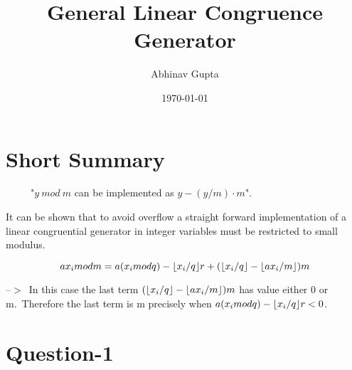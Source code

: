 \documentclass{article}
\title{\textbf{General Linear Congruence Generator}}
\author{Abhinav Gupta}
\date{\today}
\DeclarePairedDelimiter{\floor}{\lfloor}{\rfloor}
\begin{document}
 \tableofcontents
\maketitle

\section{Short Summary}
\ \ \ \ \ "\(y\ mod\ m\) can be implemented as \(y-(y/m) · m\)".

It can be shown that to avoid overflow a straight forward
implementation of a linear congruential generator in integer
variables must be restricted to small modulus.

\[ax_i mod m = a(x_i mod q)-\floor{x_i/q}r+(\floor{x_i/q}-\floor{ax_i/m})m\]

--\(>\)\ In this case the last term \((\floor{x_i/q}-\floor{ax_i/m})m\) has value either 0 or m.\
Therefore the last term is m precisely when \(a(x_i mod q)-\floor{x_i/q}r < 0\).

\section{Question-1}
\end{document}
